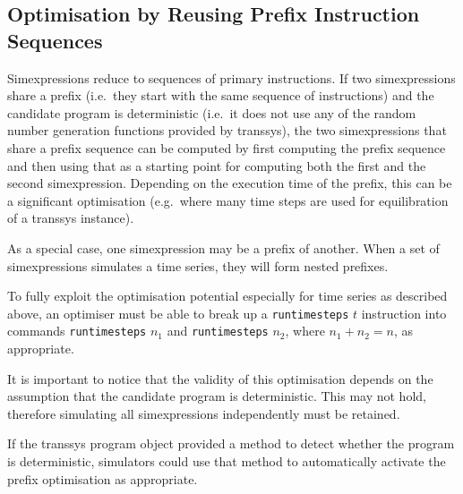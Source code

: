 \documentclass[a4paper,fleqn]{article}
\newcommand{\computercode}[1]{\texttt{#1}}
\begin{document}
\subsection{Optimisation by Reusing Prefix Instruction Sequences}

Simexpressions reduce to sequences of primary instructions. If two
simexpressions share a prefix (i.e.\ they start with the same sequence
of instructions) and the candidate program is deterministic (i.e.\ it
does not use any of the random number generation functions provided by
transsys), the two simexpressions that share a prefix sequence can be
computed by first computing the prefix sequence and then using that as
a starting point for computing both the first and the second
simexpression. Depending on the execution time of the prefix, this can
be a significant optimisation (e.g.\ where many time steps are used
for equilibration of a transsys instance).

As a special case, one simexpression may be a prefix of another.
When a set of simexpressions simulates a time series, they will form
nested prefixes.

To fully exploit the optimisation potential especially for time series
as described above, an optimiser must be able to break up a
\computercode{runtimesteps} $t$ instruction into commands
\computercode{runtimesteps} $n_1$ and \computercode{runtimesteps}
$n_2$, where $n_1 + n_2 = n$, as appropriate.

It is important to notice that the validity of this optimisation
depends on the assumption that the candidate program is
deterministic. This may not hold, therefore simulating all
simexpressions independently must be retained.

If the transsys program object provided a method to detect whether
the program is deterministic, simulators could use that method to
automatically activate the prefix optimisation as appropriate.
\end{document}
